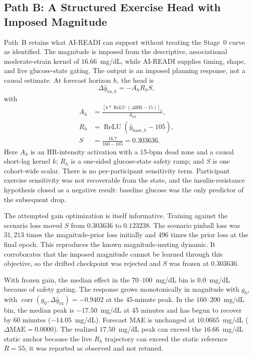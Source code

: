 \subsection{Path B: A Structured Exercise Head with Imposed Magnitude}
\label{subsec:ex_pathb}

Path~B retains what AI-READI can support without treating the Stage~0 curve as
identified. The magnitude is imposed from the descriptive, associational
moderate-strain kernel of $16.66$~mg/dL, while AI-READI supplies timing, shape,
and live glucose-state gating. The output is an imposed planning response,
not a causal estimate. At forecast horizon $h$, the head is
\begin{equation}
  \Delta\hat y_{\mathrm{ex},h}=-A_hR_hS,
  \label{eq:exercise_head}
\end{equation}
with
\begin{align}
  A_h &= \frac{\left[k * \operatorname{ReLU}
    (\Delta\mathrm{HR}-15)\right]_h}{A_{\mathrm{ref}}},
    \label{eq:exercise_activation}\\
  R_h &= \operatorname{ReLU}\left(\hat y_{\mathrm{base},h}-105\right),
    \label{eq:exercise_ramp}\\
  S &= \frac{16.7}{160-105}=0.303636.
    \label{eq:exercise_gain}
\end{align}
Here $A_h$ is an HR-intensity activation with a 15-bpm dead zone and a
causal short-lag kernel $k$; $R_h$ is a one-sided glucose-state safety ramp;
and $S$ is one cohort-wide scalar. There is no per-participant sensitivity
term. Participant exercise sensitivity was not recoverable from the state,
and the insulin-resistance hypothesis closed as a negative result: baseline
glucose was the only predictor of the subsequent drop.

The attempted gain optimization is itself informative. Training against the
scenario loss moved $S$ from $0.303636$ to $0.123238$. The scenario pinball
loss was $31{,}213$ times the magnitude-prior loss initially and $496$ times
the prior loss at the final epoch. This reproduces the known magnitude-muting
dynamic. It corroborates that the imposed magnitude cannot be learned through
this objective, so the drifted checkpoint was rejected and $S$ was frozen at
$0.303636$.

With frozen gain, the median effect in the $70$--$100$~mg/dL bin is
$0.0$~mg/dL because of safety gating. The response grows monotonically in
magnitude with $g_0$, with
$\operatorname{corr}(g_0,\Delta\hat y_{\mathrm{ex}})=-0.9402$ at the
45-minute peak. In the $160$--$200$~mg/dL bin, the median peak is
$-17.50$~mg/dL at 45 minutes and has begun to recover by 60 minutes
($-14.05$~mg/dL). Forecast MAE is unchanged at $10.0665$~mg/dL
($\Delta\mathrm{MAE}=0.0000$). The realized $17.50$~mg/dL peak can exceed
the $16.66$~mg/dL static anchor because the live $R_h$ trajectory can exceed
the static reference $R=55$; it was reported as observed and not retuned.

